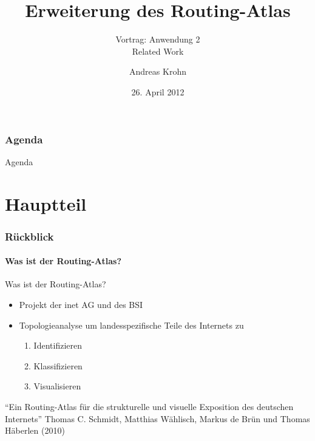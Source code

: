\documentclass[ngerman,compress,hyperref={bookmarks}]{beamer}
\title{Erweiterung des Routing-Atlas}
\subtitle{Vortrag: Anwendung 2\\ Related Work}
\author{Andreas Krohn}
\institute[HAW]{Hochschule für Angewandte Wissenschaften Hamburg}
\date[SoSe 2012]{26. April 2012}
\begin{document}
\frame[plain]{\titlepage}

\section*{Agenda}
\begin{frame}{Agenda} \setcounter{tocdepth}{1} \tableofcontents[part=1] \setcounter{tocdepth}{3} \end{frame}

\part{Hauptteil}
\section{Rückblick}


\subsection{Was ist der Routing-Atlas?}
\begin{frame}{Was ist der Routing-Atlas?}
\begin{itemize}
 \item Projekt der inet AG und des BSI
 \item Topologieanalyse um landesspezifische Teile des Internets zu
 \begin{enumerate}
  \item Identifizieren
  \item Klassifizieren
  \item Visualisieren
 \end{enumerate}
\end{itemize}
\vspace{1cm}
\begin{thebibliography}{}
 ``Ein Routing-Atlas für die strukturelle und visuelle Exposition des deutschen Internets''
\newblock Thomas C. Schmidt, Matthias Wählisch, Markus de Brün und Thomas Häberlen (2010)\\[-20pt]
\end{thebibliography}
\end{frame}
\end{document}
